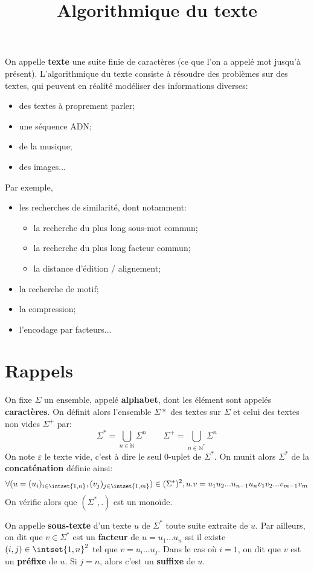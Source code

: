 \documentclass{scrartcl}
\title{Algorithmique du texte}
\author{}
\date{}
\begin{document}
	\maketitle
	 On appelle \textbf{texte} une suite finie de caractères (ce que l'on a appelé mot jusqu'à présent).
	L'algorithmique du texte consiste à résoudre des problèmes sur des textes, qui peuvent en réalité modéliser des informations diverses:
	\begin{itemize}
		\item des textes à proprement parler;
		\item une séquence ADN;
		\item de la musique;
		\item des images...
	\end{itemize}
	Par exemple,
	\begin{itemize}
		\item les recherches de similarité, dont notamment:
		\begin{itemize}
			\item la recherche du plus long sous-mot commun;
			\item la recherche du plus long facteur commun;
			\item la distance d'édition / alignement;
		\end{itemize}
		\item la recherche de motif;
		\item la compression;
		\item l'encodage par facteurs...
	\end{itemize}
	
	\section{Rappels}
		On fixe $\Sigma$ un ensemble, appelé \textbf{alphabet}, dont les élément sont appelés \textbf{caractères}.
		On définit alors l'ensemble $\Sigma*$ des textes sur $\Sigma$ et celui des textes non vides $\Sigma^+$ par:
		\[
			\Sigma^* = \bigcup_{n \in \mathbb{N}} \Sigma^n \quad \quad \Sigma^+ = \bigcup_{n\in \mathbb{N}^*} \Sigma^n
		\]
		On note $\varepsilon$ le texte vide, c'est à dire le seul 0-uplet de $\Sigma^*$.
		On munit alors $\Sigma^*$ de la \textbf{concaténation} définie ainsi:
		\[
			\forall (u = (u_i)_{i \in \intset{1,n}},(v_j)_{j \in \intset{1,m}}) \in (\Sigma^*)^2, u.v = u_1u_2...u_{n-1}u_nv_1v_2...v_{m-1}v_m 
		\]
		On vérifie alors que $(\Sigma^*,.)$ est un monoïde.
		
		On appelle \textbf{sous-texte} d'un texte $u$ de $\Sigma^*$ toute suite extraite de $u$.
		Par ailleurs, on dit que $v \in \Sigma^*$ est un \textbf{facteur} de $u = u_1...u_n$ ssi il existe $(i,j)\in\intset{1,n}^2$ tel que $v = u_i...u_j$.
		Dans le cas où $i=1$, on dit que $v$ est un \textbf{préfixe} de $u$. Si $j=n$, alors c'est un \textbf{suffixe} de $u$.
\end{document}
